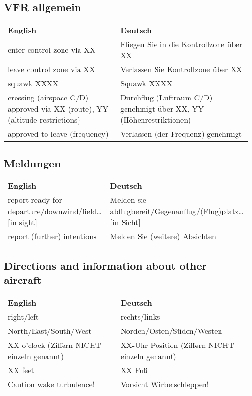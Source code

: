 
\subsection{VFR allgemein}
\begin{table}[H]
	\begin{tabularx}{\textwidth}{XX}
		\textbf{English} & \textbf{Deutsch} \\
		enter control zone via XX     & Fliegen Sie in die Kontrollzone über XX \\
		leave control zone via XX     & Verlassen Sie Kontrollzone über XX      \\
		squawk XXXX                   & Squawk XXXX                             \\
		crossing (airspace C/D) approved via XX (route), YY (altitude restrictions) & Durchflug (Luftraum C/D) genehmigt über XX, YY (Höhenrestriktionen) \\
		approved to leave (frequency) & Verlassen (der Frequenz) genehmigt     
	\end{tabularx}%
\end{table}

\subsection{Meldungen}
\begin{table}[H]
	\begin{tabularx}{\textwidth}{XX}
		\textbf{English} & \textbf{Deutsch} \\
		report ready for departure/downwind/field… {[}in sight{]}& Melden sie abflugbereit/Gegenanflug/(Flug)platz… {[}in Sicht{]} \\
		report (further) intentions                               & Melden Sie (weitere) Absichten                                     
	\end{tabularx}%
\end{table}

\subsection{Directions and information about other aircraft}
\begin{table}[H]
	\begin{tabularx}{\textwidth}{XX}
		\textbf{English} & \textbf{Deutsch} \\
		right/left               & rechts/links              \\
		North/East/South/West    & Norden/Osten/Süden/Westen \\
		XX o'clock (Ziffern NICHT einzeln genannt) & XX-Uhr Position (Ziffern NICHT einzeln genannt) \\
		XX feet                  & XX Fuß                    \\
		Caution wake turbulence! & Vorsicht Wirbelschleppen!
	\end{tabularx}%
\end{table}


